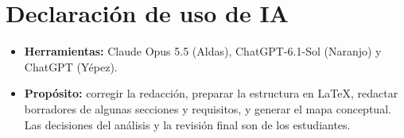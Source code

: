 \section*{Declaración de uso de IA}

\begin{itemize}
  \item \textbf{Herramientas:} Claude Opus 5.5 (Aldas), ChatGPT-6.1-Sol (Naranjo) y ChatGPT (Yépez).
  \item \textbf{Propósito:} corregir la redacción, preparar la estructura en \LaTeX{}, redactar borradores de algunas secciones y requisitos, y generar el mapa conceptual. Las decisiones del análisis y la revisión final son de los estudiantes.
\end{itemize}
